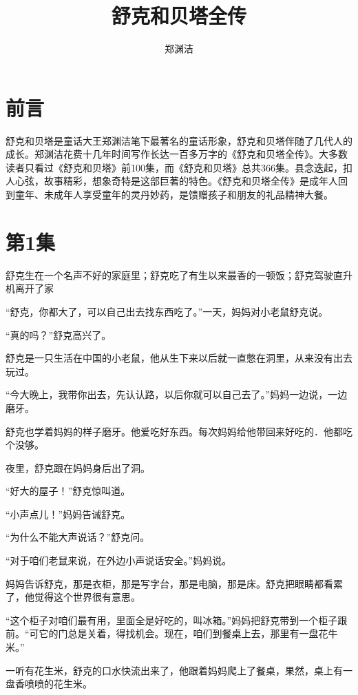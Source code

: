 \documentclass[a4paper,12pt,UTF8,twoside]{ctexbook}
\title{\heiti\zihao{0} 舒克和贝塔全传}
\author{郑渊洁}
\date{}
\begin{document}
	
\maketitle
\tableofcontents
	
\frontmatter
\chapter{前言}

舒克和贝塔是童话大王郑渊洁笔下最著名的童话形象，舒克和贝塔伴随了几代人的成长。郑渊洁花费十几年时间写作长达一百多万字的《舒克和贝塔全传》。大多数读者只看过《舒克和贝塔》前100集，而《舒克和贝塔》总共366集。县念迭起，扣人心弦，故事精彩，想象奇特是这部巨著的特色。《舒克和贝塔全传》是成年人回到童年、未成年人享受童年的灵丹妙药，是馈赠孩子和朋友的礼品精神大餐。

\mainmatter
	
\chapter{第1集}

舒克生在一个名声不好的家庭里；舒克吃了有生以来最香的一顿饭；舒克驾驶直升机离开了家

“舒克，你都大了，可以自己出去找东西吃了。”一天，妈妈对小老鼠舒克说。
   
“真的吗？”舒克高兴了。
  
舒克是一只生活在中国的小老鼠，他从生下来以后就一直憋在洞里，从来没有出去玩过。

“今大晚上，我带你出去，先认认路，以后你就可以自己去了。”妈妈一边说，一边磨牙。

舒克也学着妈妈的样子磨牙。他爱吃好东西。每次妈妈给他带回来好吃的．他都吃个没够。

夜里，舒克跟在妈妈身后出了洞。

“好大的屋子！”舒克惊叫道。

“小声点儿！”妈妈告诫舒克。

“为什么不能大声说话？”舒克问。

“对于咱们老鼠来说，在外边小声说话安全。”妈妈说。

妈妈告诉舒克，那是衣柜，那是写字台，那是电脑，那是床。舒克把眼睛都看累了，他觉得这个世界很有意思。

“这个柜子对咱们最有用，里面全是好吃的，叫冰箱。”妈妈把舒克带到一个柜子跟前。“可它的门总是关着，得找机会。现在，咱们到餐桌上去，那里有一盘花牛米。”

一听有花生米，舒克的口水快流出来了，他跟着妈妈爬上了餐桌，果然，桌上有一盘香喷喷的花生米。
\end{document}
